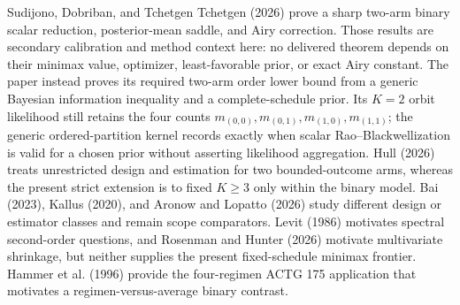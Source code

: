 Sudijono, Dobriban, and Tchetgen Tchetgen (2026) prove a sharp two-arm binary scalar reduction, posterior-mean saddle, and Airy correction. Those results are secondary calibration and method context here: no delivered theorem depends on their minimax value, optimizer, least-favorable prior, or exact Airy constant. The paper instead proves its required two-arm order lower bound from a generic Bayesian information inequality and a complete-schedule prior. Its \(K=2\) orbit likelihood still retains the four counts \(m_{(0,0)},m_{(0,1)},m_{(1,0)},m_{(1,1)}\); the generic ordered-partition kernel records exactly when scalar Rao--Blackwellization is valid for a chosen prior without asserting likelihood aggregation. Hull (2026) treats unrestricted design and estimation for two bounded-outcome arms, whereas the present strict extension is to fixed \(K\geq3\) only within the binary model. Bai (2023), Kallus (2020), and Aronow and Lopatto (2026) study different design or estimator classes and remain scope comparators. Levit (1986) motivates spectral second-order questions, and Rosenman and Hunter (2026) motivate multivariate shrinkage, but neither supplies the present fixed-schedule minimax frontier. Hammer et al. (1996) provide the four-regimen ACTG 175 application that motivates a regimen-versus-average binary contrast.